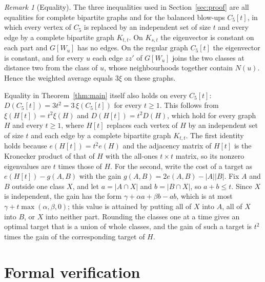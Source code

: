 \documentclass[11pt]{article}
\theoremstyle{remark}
\newtheorem{remark}[theorem]{Remark}
\begin{document}
\begin{remark}[Equality]\label{rem:equality}
The three inequalities used in Section~\ref{sec:proof} are all equalities for complete bipartite
graphs and for the balanced blow-ups $C_5[t]$, in which every vertex of $C_5$ is replaced by an
independent set of size $t$ and every edge by a complete bipartite graph $K_{t,t}$. On $K_{s,t}$
the eigenvector is constant on each part and $G[W_u]$ has no edges. On the regular graph $C_5[t]$
the eigenvector is constant, and for every $u$ each edge $zz'$ of $G[W_u]$ joins the two classes
at distance two from the class of $u$, whose neighbourhoods together contain $N(u)$. Hence the
weighted average equals $3\xi$ on these graphs.

Equality in Theorem~\ref{thm:main} itself also holds on every $C_5[t]$: $D(C_5[t])=3t^2=3\,\xi(C_5[t])$
for every $t\ge1$. This follows from $\xi(H[t])=t^2\xi(H)$ and $D(H[t])=t^2D(H)$, which hold for
every graph $H$ and every $t\ge1$, where $H[t]$ replaces each vertex of $H$ by an independent set
of size $t$ and each edge by a complete bipartite graph $K_{t,t}$. The first identity holds
because $e(H[t])=t^2e(H)$ and the adjacency matrix of $H[t]$ is the Kronecker product of that of
$H$ with the all-ones $t\times t$ matrix, so its nonzero eigenvalues are $t$ times those of $H$.
For the second, write the cost of a target as $e(H[t])-g(A,B)$ with the gain
$g(A,B)=2e(A,B)-|A||B|$. Fix $A$ and $B$ outside one class $X$, and let $a=|A\cap X|$ and
$b=|B\cap X|$, so $a+b\le t$. Since $X$ is independent, the gain has the form
$\gamma+\alpha a+\beta b-ab$, which is at most $\gamma+t\max(\alpha,\beta,0)$; this value is attained
by putting all of $X$ into $A$, all of $X$ into $B$, or $X$ into neither part. Rounding the classes
one at a time gives an optimal target that is a union of whole classes, and the gain of such a
target is $t^2$ times the gain of the corresponding target of $H$.
\end{remark}

\section{Formal verification}
\end{document}

